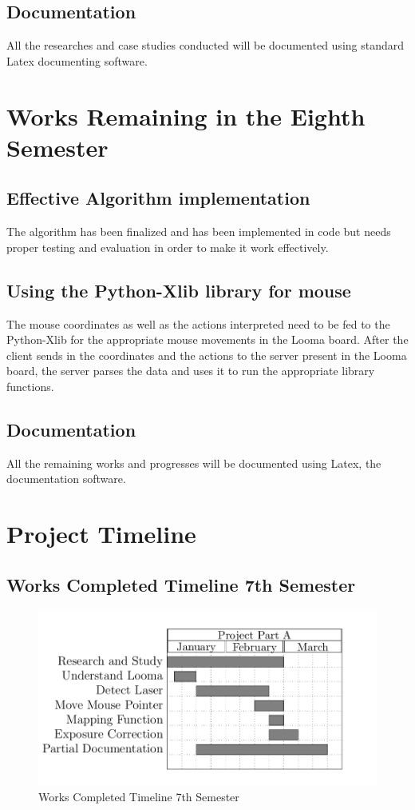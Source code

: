 \documentclass[12pt, a4paper]{article}
\begin{document}
\subsection{Documentation}
	All the researches and case studies conducted will be documented using standard Latex documenting software.

\newpage
\section{Works Remaining in the Eighth Semester}
\subsection{Effective Algorithm implementation}
	The algorithm has been finalized and has been implemented in code but needs proper testing and evaluation in order to make it work effectively.

\subsection{Using the Python-Xlib library for mouse}
	The mouse coordinates as well as the actions interpreted need to be fed to the Python-Xlib for the appropriate mouse movements in the Looma board. After the client sends in the coordinates and the actions to the server present in the Looma board, the server parses the data and uses it to run the appropriate library functions.

\subsection{Documentation}
	All the remaining works and progresses will be documented using Latex, the documentation software. 

\newpage
\section{Project Timeline}
\subsection{Works Completed Timeline 7th Semester}
\begin{figure}[htp]
\centering
\includegraphics[scale=0.35]{reformed1.png}
\caption{Works Completed Timeline 7th Semester}
\label{}
\end{figure}
\end{document}
